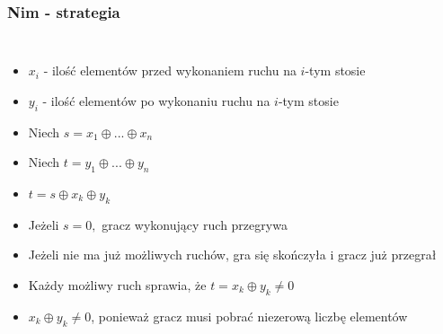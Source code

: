 \documentclass[polish,envcountsect,10pt]{beamer}
\begin{document}
                \begin{frame}
                    \frametitle{Nim - strategia}
                    \begin{columns}
                            \begin{itemize}
                                \item<1-> $x_i$ - ilość elementów przed wykonaniem ruchu na $i$-tym stosie
                                \item<1-> $y_i$ - ilość elementów po wykonaniu ruchu na $i$-tym stosie
                                \item<1-> Niech $s = x_1 \oplus ... \oplus x_n$
                                \item<1-> Niech $t = y_1 \oplus ... \oplus y_n$
                                \item<1-> $t = s \oplus x_k \oplus y_k$
                                \item<2-> Jeżeli $s = 0,$ gracz wykonujący ruch przegrywa
                                \item<3-> Jeżeli nie ma już możliwych ruchów, gra się skończyła i gracz już przegrał
                                \item<4-> Każdy możliwy ruch sprawia, że $t = x_k \oplus y_k \neq 0$
                                \item<5-> $x_k \oplus y_k \neq 0$, ponieważ gracz musi pobrać niezerową liczbę elementów
                            \end{itemize}
                    \end{columns}
                \end{frame}
\end{document}
